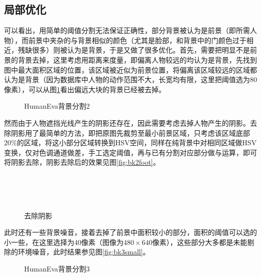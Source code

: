\subsection{局部优化}
可以看出，用简单的阈值分割无法保证正确性，部分背景被认为是前景（即所需人物），而前景中夹杂的与背景相似的颜色（尤其是脸部，和背景中的门颜色过于相近，残缺很多）则被认为是背景，于是又做了很多优化。首先，需要把明显不是前景的背景去掉，这里考虑用距离来度量，即偏离人物较远的均认为是背景，先找到图中最大面积区域的位置，该区域被近似为前景位置，将偏离该区域较远的区域都认为是背景（因为数据库中人物的动作范围不大，长宽均有限，这里把阈值选为80 像素），可以从图\ref{fig:bkfar}看出偏远大块的背景已经被去掉。

\begin{figure}[htbp]
  \centering
  \hspace{1cm}
  \caption{HumanEva背景分割2}\label{fig:bkfar}
\end{figure}

然而由于人物遮挡光线产生的阴影还存在，因此需要考虑去掉人物产生的阴影。去除阴影用了最简单的方法，即把原图先裁剪至最小前景区域，只考虑该区域底部20\%的区域，将这小部分区域转换到HSV空间，同样在纯背景中对相同区域做HSV变换，仅对色调通道做差，手工选定阈值，再与已有分割对应部分做与运算，即可将阴影去除，阴影去除后的效果见图\ref{fig:bk2foot}。

\begin{figure}[htbp]
  \centering
  \hspace{.5cm}
  \\
  \hspace{.5cm}
  \\
  \\
  \caption{去除阴影}
\end{figure}

此时还有一些背景噪音，接着去掉了前景中面积较小的部分，面积的阈值可以选的小一些，在这里选择为40像素（图像为$480\times 640$像素），这些部分大多都是未能剔除的环境噪音，此时结果参见图\ref{fig:bk3small}。

\begin{figure}[htbp]
  \centering
  \hspace{1cm}
  \caption{HumanEva背景分割3}
\end{figure}


